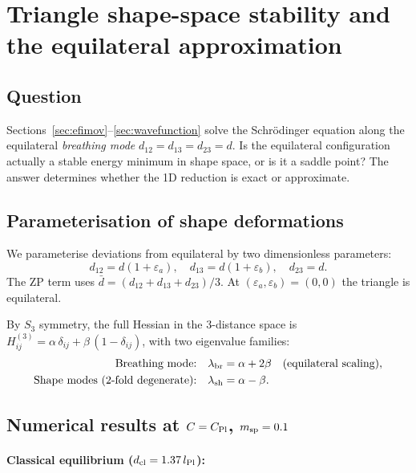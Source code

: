 \section{Triangle shape-space stability and the equilateral approximation}
\label{sec:triangle_stability}

\subsection{Question}

Sections~\ref{sec:efimov}--\ref{sec:wavefunction} solve the Schr\"odinger
equation along the equilateral \emph{breathing mode} $d_{12}=d_{13}=d_{23}=d$.
Is the equilateral configuration actually a stable energy minimum in shape
space, or is it a saddle point?  The answer determines whether the 1D
reduction is exact or approximate.

\subsection{Parameterisation of shape deformations}

We parameterise deviations from equilateral by two dimensionless parameters:
\begin{equation}
  d_{12} = d(1+\varepsilon_a),\quad
  d_{13} = d(1+\varepsilon_b),\quad
  d_{23} = d.
\end{equation}
The ZP term uses $\bar{d}=(d_{12}+d_{13}+d_{23})/3$.
At $(\varepsilon_a,\varepsilon_b)=(0,0)$ the triangle is equilateral.

By $S_3$ symmetry, the full Hessian in the 3-distance space is
$H_{ij}^{(3)} = \alpha\,\delta_{ij} + \beta\,(1-\delta_{ij})$,
with two eigenvalue families:
\begin{align}
  \text{Breathing mode:} &\quad \lambda_{\rm br} = \alpha + 2\beta
    \quad (\text{equilateral scaling}), \\
  \text{Shape modes (2-fold degenerate):} &\quad \lambda_{\rm sh} = \alpha - \beta.
\end{align}

\subsection{Numerical results at \texorpdfstring{$C=C_{\rm Pl}$}{C=C\_Pl},
  \texorpdfstring{$m_{\rm sp}=0.1$}{m\_sp=0.1}}

\paragraph{Classical equilibrium ($d_{\rm cl}=1.37\,l_{\rm Pl}$):}

